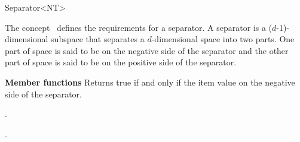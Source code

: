 

\begin{ccRefConcept}{Separator<NT>}


\ccDefinition
  
The concept \ccRefName\ defines the requirements for a separator.
A separator is a ($d$-1)-dimensional subspace that separates a $d$-dimensional space into two parts.
One part of space is said to be on the negative side of the separator and the other part of space is 
said to be on the positive side of the separator.

\ccCreation
{}  %


{\bf Member functions}
{Returns true if and only if the item value on the negative side of the separator.}


\ccHasModels

.

\ccSeeAlso

.

\end{ccRefConcept}


